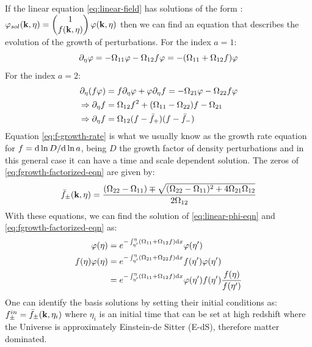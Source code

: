 If the linear equation \cref{eq:linear-field}
has solutions of the form :
\beeqc$
\varphi_{sol}(\mathbf{k},\eta)=\begin{pmatrix}1\\
f(\mathbf{k},\eta)
\end{pmatrix}\varphi(\mathbf{k},\eta)
$
then we can find an equation that describes the evolution of the growth
of perturbations.
For the index $a=1$:
\begin{equation}
\partial_{\eta}\varphi=-\Omega_{11}\varphi-\Omega_{12}f\varphi=-(\Omega_{11}+\Omega_{12}f)\varphi\label{eq:linear-phi-eqn}
\end{equation}
For the index $a=2$:
\begin{align}
\partial_{\eta}(f\varphi) & =f\partial_{\eta}\varphi+\varphi\partial_{\eta} f=-\Omega_{21}\varphi-\Omega_{22}f\varphi\nonumber \\
\Rightarrow\partial_{\eta} f & =\Omega_{12}f^{2}+(\Omega_{11}-\Omega_{22})f-\Omega_{21}\label{eq:f-growth-rate}\\
\Rightarrow\partial_{\eta} f & =\Omega_{12}(f-\bar{f}_{+})(f-\bar{f}_{-})\label{eq:fgrowth-factorized-eqn}
\end{align}
Equation \ref{eq:f-growth-rate} is what we usually know as the growth
rate equation for $f=\mathrm{d}\ln D/\mathrm{d}\ln a$, being $D$ the growth factor
of density perturbations and in this general case it can have a time
and scale dependent solution. 
The zeros of \cref{eq:fgrowth-factorized-eqn} are given by:
\begin{equation}
\bar{f}_{\pm}(\mathbf{k},\eta)=\frac{(\Omega_{22}-\Omega_{11})\mp\sqrt{(\Omega_{22}-\Omega_{11})^{2}+4\Omega_{21}\Omega_{12}}}{2\Omega_{12}}\label{eq:2.4}
\end{equation}
With these equations, we can find the solution of \cref{eq:linear-phi-eqn} and \cref{eq:fgrowth-factorized-eqn} as:
\begin{align*}
\varphi(\eta) & =e^{-\int_{\eta'}^{\eta}(\Omega_{11}+\Omega_{12}f)\mathrm{d} x}\varphi(\eta')\\
f(\eta)\varphi(\eta) & =e^{-\int_{\eta'}^{\eta}(\Omega_{21}+\Omega_{22}f)\mathrm{d} x}f(\eta')\varphi(\eta')\\
 & =e^{-\int_{\eta'}^{\eta}(\Omega_{11}+\Omega_{12}f)\mathrm{d} x}\varphi(\eta')f(\eta')\frac{f(\eta)}{f(\eta')}
\end{align*}
One can identify the basis solutions by setting their initial conditions
as:
\beeqc$
f_{\pm}^{in}=\bar{f}_{\pm}(\mathbf{k},\eta_{i})
$
where $\eta_{i}$ is an initial time that can be set at high redshift
where the Universe is approximately Einstein-de Sitter (E-dS), therefore
matter dominated.

